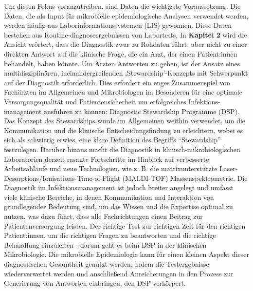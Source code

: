 \documentclass[
]{book}
\begin{document}
Um diesen Fokus voranzutreiben, sind Daten die wichtigste Voraussetzung. Die Daten, die als Input für mikrobielle epidemiologische Analysen verwendet werden, werden häufig aus Laborinformationssystemen (LIS) gewonnen. Diese Daten bestehen aus Routine-diagnoseergebnissen von Labortests. In \textbf{Kapitel 2} wird die Ansicht erörtert, dass die Diagnostik zwar zu Rohdaten führt, aber nicht zu einer direkten Antwort auf die klinische Frage, die ein Arzt, der einen Patient:innen behandelt, haben könnte. Um Ärzten Antworten zu geben, ist der Ansatz eines multidisziplinären, ineinandergreifenden ‚Stewardship'-Konzepts mit Schwerpunkt auf der Diagnostik erforderlich. Dies erfordert ein enges Zusammenspiel von Fachärzten im Allgemeinen und Mikrobiologen im Besonderen für eine optimale Versorgungsqualität und Patientensicherheit um erfolgreiches Infektions-management ausführen zu können: Diagnostic Stewardship Programme (DSP). Das Konzept des Stewardships wurde im Allgemeinen weithin verwendet, um die Kommunikation und die klinische Entscheidungsfindung zu erleichtern, wobei es sich als schwierig erwies, eine klare Definition des Begriffs ``Stewardship'' festzulegen. Darüber hinaus macht die Diagnostik in klinisch-mikrobiologischen Laboratorien derzeit rasante Fortschritte im Hinblick auf verbesserte Arbeitsabläufe und neue Technologien, wie z. B. die matrixunterstützte Laser-Desorptions/Ionisations-Time-of-Flight (MALDI-TOF) Massenspektrometrie. Die Diagnostik im Infektionsmanagement ist jedoch breiter angelegt und umfasst viele klinische Bereiche, in denen Kommunikation und Interaktion von grundlegender Bedeutung sind, um das Wissen und die Expertise optimal zu nutzen, was dazu führt, dass alle Fachrichtungen einen Beitrag zur Patientenversorgung leisten. Der richtige Test zur richtigen Zeit für den richtigen Patient:innen, um die richtigen Fragen zu beantworten und die richtige Behandlung einzuleiten - darum geht es beim DSP in der klinischen Mikrobiologie. Die mikrobielle Epidemiologie kann für einen kleinen Aspekt dieser diagnostischen Gesamtheit genutzt werden, indem die Testergebnisse wiederverwertet werden und anschließend Anreicherungen in den Prozess zur Generierung von Antworten einbringen, den DSP verkörpert.
\end{document}
